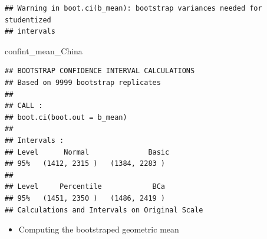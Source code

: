 \documentclass[]{book}
\newenvironment{Shaded}{\begin{snugshade}}{\end{snugshade}}
\newcommand{\NormalTok}[1]{{#1}}
\providecommand{\tightlist}{%
  \setlength{\itemsep}{0pt}\setlength{\parskip}{0pt}}
\begin{document}
\begin{verbatim}
## Warning in boot.ci(b_mean): bootstrap variances needed for studentized
## intervals
\end{verbatim}

\begin{Shaded}
\begin{Highlighting}[]
\NormalTok{confint_mean_China}
\end{Highlighting}
\end{Shaded}

\begin{verbatim}
## BOOTSTRAP CONFIDENCE INTERVAL CALCULATIONS
## Based on 9999 bootstrap replicates
## 
## CALL : 
## boot.ci(boot.out = b_mean)
## 
## Intervals : 
## Level      Normal              Basic         
## 95%   (1412, 2315 )   (1384, 2283 )  
## 
## Level     Percentile            BCa          
## 95%   (1451, 2350 )   (1486, 2419 )  
## Calculations and Intervals on Original Scale
\end{verbatim}

\begin{itemize}
\tightlist
\item
  Computing the bootstraped geometric mean
\end{itemize}
\end{document}
